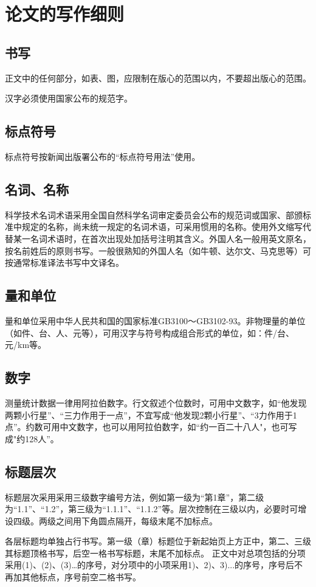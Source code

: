 \chapter{论文的写作细则}
\label{chap:details}
\section{书写}
\par 正文中的任何部分，如表、图，应限制在版心的范围以内，不要超出版心的范围。
\par 汉字必须使用国家公布的规范字。

\section{标点符号}
\par 标点符号按新闻出版署公布的“标点符号用法”使用。

\section{名词、名称}
\par 科学技术名词术语采用全国自然科学名词审定委员会公布的规范词或国家、部颁标准中规定的名称，尚未统一规定的名词术语，可采用惯用的名称。使用外文缩写代替某一名词术语时，在首次出现处加括号注明其含义。外国人名一般用英文原名，按名前姓后的原则书写。一般很熟知的外国人名（如牛顿、达尔文、马克思等）可按通常标准译法书写中文译名。

\section{量和单位}
\par 量和单位采用中华人民共和国的国家标准GB3100～GB3102-93。非物理量的单位（如件、台、人、元等），可用汉字与符号构成组合形式的单位，如：件/台、元/km等。

\section{数字}
\par 测量统计数据一律用阿拉伯数字。行文叙述个位数时，可用中文数字，如“他发现两颗小行星”、“三力作用于一点”，不宜写成“他发现2颗小行星”、“3力作用于1点”。约数可用中文数字，也可以用阿拉伯数字，如“约一百二十八人"，也可写成"约128人”。

\section{标题层次}
\par 标题层次采用采用三级数字编号方法，例如第一级为“第1章”，第二级为“1.1”、“1.2”，第三级为“1.1.1”、“1.1.2”等。层次控制在三级以内，必要时可增设四级。两级之间用下角圆点隔开，每级末尾不加标点。
\par 各层标题均单独占行书写。第一级（章）标题位于新起始页上方正中，第二、三级其标题顶格书写，后空一格书写标题，末尾不加标点。
正文中对总项包括的分项采用(1)、(2)、(3)…的序号，对分项中的小项采用1)、2)、3)...的序号，序号后不再加其他标点，序号前空二格书写。

